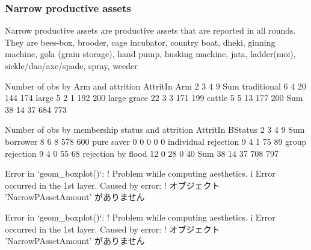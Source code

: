 \subsubsection{Narrow productive assets}


Narrow productive assets are productive assets that are reported in all rounds. They are bees-box, brooder, cage incubator, country boat, dheki, ginning machine, gola (grain storage), hand pump, husking machine, jata, ladder(moi), sickle/dao/axe/spade, spray, weeder



\begin{Schunk}
\begin{Soutput}


Number of obs by Arm and attrition
             AttritIn
Arm             2   3   4   9 Sum
  traditional   6   4  20 144 174
  large         5   2   1 192 200
  large grace  22   3   3 171 199
  cattle        5   5  13 177 200
  Sum          38  14  37 684 773


Number of obs by membership status and attrition
                      AttritIn
BStatus                  2   3   4   9 Sum
  borrower               8   6   8 578 600
  pure saver             0   0   0   0   0
  individual rejection   9   4   1  75  89
  group rejection        9   4   0  55  68
  rejection by flood    12   0  28   0  40
  Sum                   38  14  37 708 797
\end{Soutput}
\end{Schunk}





\begin{Schunk}
\begin{Soutput}
Error in `geom_boxplot()`:
! Problem while computing aesthetics.
i Error occurred in the 1st layer.
Caused by error:
! オブジェクト 'NarrowPAssetAmount' がありません
\end{Soutput}
\begin{Soutput}
Error in `geom_boxplot()`:
! Problem while computing aesthetics.
i Error occurred in the 1st layer.
Caused by error:
! オブジェクト 'NarrowPAssetAmount' がありません
\end{Soutput}
\end{Schunk}


